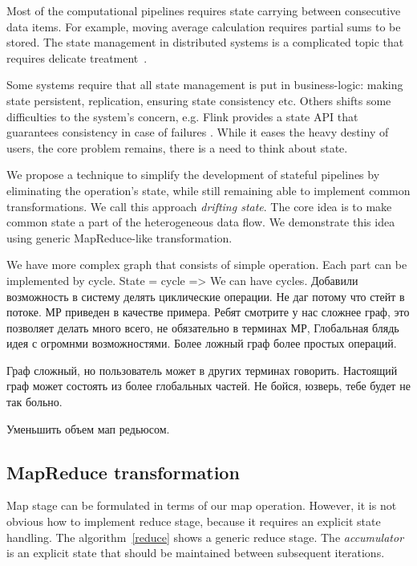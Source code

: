 
\label{fs-drifting}

Most of the computational pipelines requires state carrying between consecutive data items. For example, moving average calculation requires partial sums to be stored. The state management in distributed systems is a complicated topic that requires delicate treatment~\cite{Carbone:2017:SMA:3137765.3137777}.

Some systems require that all state management is put in business-logic: making state persistent, replication, ensuring state consistency etc. Others shifts some difficulties to the system's concern, e.g. Flink provides a state API that guarantees consistency in case of failures \cite{2015arXiv150608603C}. While it eases the heavy destiny of users, the core problem remains, there is a need to think about state.

We propose a technique to simplify the development of stateful pipelines by eliminating the operation's state, while still remaining able to implement common transformations. We call this approach {\it drifting state}. The core idea is to make common state a part of the heterogeneous data flow. We demonstrate this idea using generic MapReduce-like transformation.

We have more complex graph that consists of simple operation. Each part can be implemented by cycle. State = cycle => We can have cycles. Добавили возможность в систему делять циклические операции. Не даг потому что стейт в потоке. МР приведен в качестве примера. Ребят смотрите у нас сложнее граф, это позволяет делать много всего, не обязательно в терминах МР, Глобальная блядь идея с огромнми возможностями. Более ложный граф более простых операций.

Граф сложный, но пользователь может в других терминах говорить. Настоящий граф может состоять из более глобальных частей. Не бойся, юзверь, тебе будет не так больно.

Уменьшить объем мап редьюсом.

\subsection{MapReduce transformation}
Map stage can be formulated in terms of our map operation. However, it is not obvious how to implement reduce stage, because it requires an explicit state handling. The algorithm~\ref{reduce} shows a generic reduce stage. The {\it accumulator} is an explicit state that should be maintained between subsequent iterations.

